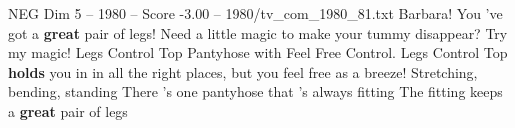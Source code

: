\begin{textsample}{NEG Dim 5 – 1980 – Score -3.00 – 1980/tv\_com\_1980\_81.txt}  \label{ex:f5_neg_081}
Barbara!
You 've got a \textbf{great} pair of legs!
Need a little magic to make your tummy disappear?
Try my magic!
Legs Control Top Pantyhose with Feel Free Control.
Legs Control Top \textbf{holds} you in in all the right places, but you feel free as a breeze!
Stretching, bending, standing There 's one pantyhose that 's always fitting The fitting keeps a \textbf{great} pair of legs

\end{textsample}
